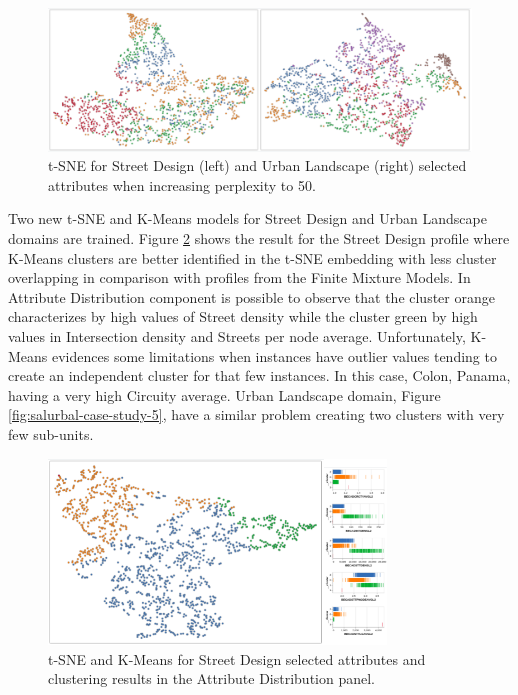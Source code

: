 \begin{figure}[ht]
 \centering
 \includegraphics[width=1.0\textwidth]{salurbal-case-study-3.png}
 \caption{t-SNE for Street Design (left) and Urban Landscape (right) selected attributes when increasing perplexity to 50.}
 \label{fig:salurbal-case-study-3}
\end{figure}

Two new t-SNE and K-Means models for Street Design and Urban Landscape domains are trained. Figure \ref{fig:salurbal-case-study-4} shows the result for the Street Design profile where K-Means clusters are better identified in the t-SNE embedding with less cluster overlapping in comparison with profiles from the Finite Mixture Models. In Attribute Distribution component is possible to observe that the cluster orange characterizes by high values of Street density while the cluster green by high values in Intersection density and Streets per node average. Unfortunately, K-Means evidences some limitations when instances have outlier values tending to create an independent cluster for that few instances. In this case, Colon, Panama, having a very high Circuity average. Urban Landscape domain, Figure \ref{fig:salurbal-case-study-5}, have a similar problem creating two clusters with very few sub-units.

\begin{figure}[ht]
 \centering
 \includegraphics[width=0.8\textwidth]{salurbal-case-study-4.png}
 \caption{t-SNE and K-Means for Street Design selected attributes and clustering results in the Attribute Distribution panel.}
 \label{fig:salurbal-case-study-4}
\end{figure}

